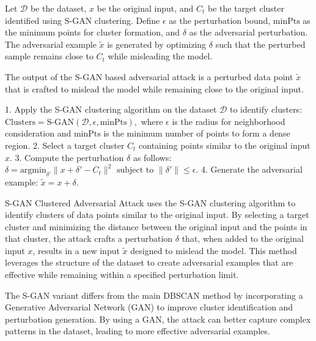 Let $\mathcal{D}$ be the dataset, $x$ be the original input, and $C_t$ be the target cluster identified using S-GAN clustering. Define $\epsilon$ as the perturbation bound, $\text{minPts}$ as the minimum points for cluster formation, and $\delta$ as the adversarial perturbation. The adversarial example $\tilde{x}$ is generated by optimizing $\delta$ such that the perturbed sample remains close to $C_t$ while misleading the model.


The output of the S-GAN based adversarial attack is a perturbed data point $\tilde{x}$ that is crafted to mislead the model while remaining close to the original input.


1. Apply the S-GAN clustering algorithm on the dataset $\mathcal{D}$ to identify clusters:
   $
   \text{Clusters} = \text{S-GAN}(\mathcal{D}, \epsilon, \text{minPts}),
   $
   where $ \epsilon $ is the radius for neighborhood consideration and $ \text{minPts} $ is the minimum number of points to form a dense region.
2. Select a target cluster $ C_t $ containing points similar to the original input $ x $.
3. Compute the perturbation $ \delta $ as follows:
   $
   \delta = \text{argmin}_{\delta'} \| x + \delta' - C_t \|^2 \text{ subject to } \|\delta'\| \leq \epsilon.
   $
4. Generate the adversarial example:
   $
   \tilde{x} = x + \delta.
   $

S-GAN Clustered Adversarial Attack uses the S-GAN clustering algorithm to identify clusters of data points similar to the original input. By selecting a target cluster and minimizing the distance between the original input and the points in that cluster, the attack crafts a perturbation $ \delta $ that, when added to the original input $ x $, results in a new input $ \tilde{x} $ designed to mislead the model. This method leverages the structure of the dataset to create adversarial examples that are effective while remaining within a specified perturbation limit.

The S-GAN variant differs from the main DBSCAN method by incorporating a Generative Adversarial Network (GAN) to improve cluster identification and perturbation generation. By using a GAN, the attack can better capture complex patterns in the dataset, leading to more effective adversarial examples.